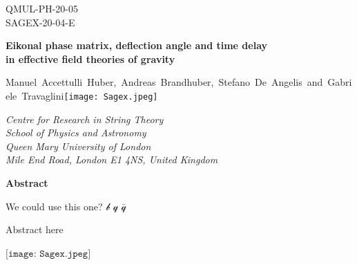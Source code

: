 \documentclass[a4paper,11pt]{article}
\numberwithin{equation}{section}
\begin{document}

\begin{flushright}
	QMUL-PH-20-05\\
	SAGEX-20-04-E\\
\end{flushright}

\vspace{20pt} 

\begin{center}

		
	{\Large \bf  Eikonal phase matrix, deflection angle and time delay}  \\
	\vspace{0.3 cm} {\Large \bf  in effective field theories of gravity}


	\vspace{25pt}

	{\mbox {\sf  \!\!\!\!Manuel~Accettulli~Huber, Andreas~Brandhuber, Stefano~De~Angelis and 				Gabriele~Travaglini{\texttt{[image: Sagex.jpeg]}}
	}}
	\vspace{0.5cm}

	\begin{center}
		{\small \em
			Centre for Research in String Theory\\
			School of Physics and Astronomy\\
			Queen Mary University of London\\
			Mile End Road, London E1 4NS, United Kingdom
		}
	\end{center}


	\vspace{40pt}  %

	{\bf Abstract}
\end{center}

\vspace{0.3cm}

\noindent

\noindent



We could use this one? $\mathscr{b}$     $\mathscr{q}$      $\mathscr{\bar{q}}$  

Abstract here

 
\vfill
\hrulefill
\newline
\vspace{-1cm}
${\texttt{[image: Sagex.jpeg]}}$~\!
\end{document}
